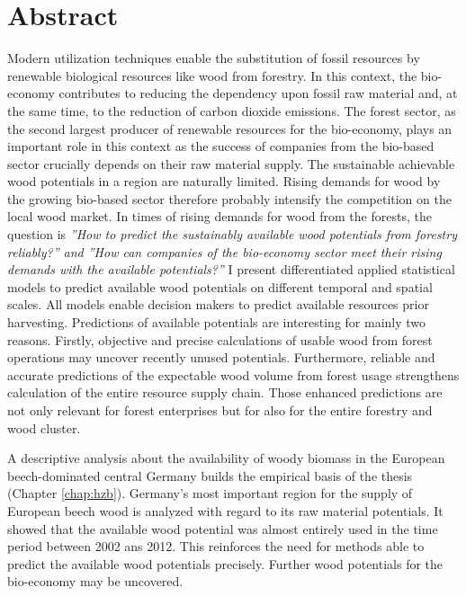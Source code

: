 \chapter*{Abstract}
\label{chap:Summary}
Modern utilization techniques enable the substitution of fossil resources by renewable biological resources like wood from forestry. In this context, the bio-economy contributes to reducing the dependency upon fossil raw material and, at the same time, to the reduction of carbon dioxide emissions. The forest sector, as the second largest producer of renewable resources for the bio-economy, plays an important role in this context as the success of companies from the bio-based sector crucially depends on their raw material supply. The sustainable achievable wood potentials in a region are naturally limited. Rising demands for wood by the growing bio-based sector therefore probably intensify the competition on the local wood market. In times of rising demands for wood from the forests, the question is \textit{''How to predict the sustainably available wood potentials from forestry reliably?'' and ''How can companies of the bio-economy sector meet their rising demands with the available potentials?''} I present differentiated applied statistical models to predict available wood potentials on different temporal and spatial scales. All models enable decision makers to predict available resources prior harvesting. Predictions of available potentials are interesting for mainly two reasons. Firstly, objective and precise calculations of usable wood from forest operations may uncover recently unused potentials. Furthermore, reliable and accurate predictions of the expectable wood volume from forest usage strengthens calculation of the entire resource supply chain. Those enhanced predictions are not only relevant for forest enterprises but for also for the entire forestry and wood cluster.

A descriptive analysis about the availability of woody biomass in the European beech-dominated central Germany builds the empirical basis of the thesis (Chapter \ref{chap:hzb}). Germany's most important region for the supply of European beech wood is analyzed with regard to its raw material potentials. It showed that the available wood potential was almost entirely used in the time period between 2002 ans 2012. This reinforces the need for methods able to predict the available wood potentials precisely. Further wood potentials for the bio-economy may be uncovered.

